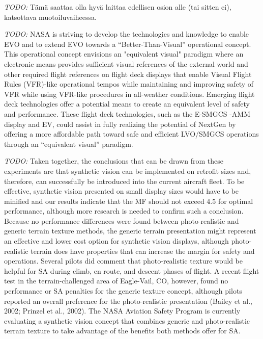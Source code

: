 \documentclass[utf8,bachelor,manualbib]{gradu3}
\begin{document}
\emph{TODO:}
Tämä saattaa olla hyvä laittaa edellisen osion alle (tai sitten ei), katsottava muotoiluvaiheessa.

\emph{TODO:}
NASA is striving to develop the technologies and knowledge to enable EVO and to extend EVO towards a “Better-Than-Visual” operational concept. This operational concept envisions an "equivalent visual" paradigm where an electronic means provides sufficient visual references of the external world and other required flight references on flight deck displays that enable Visual Flight Rules (VFR)-like operational tempos while maintaining and improving safety of VFR while using VFR-like procedures in all-weather conditions.\citep{prinzel2013}
Emerging flight deck technologies offer a potential means to create an equivalent level of safety and performance. These flight deck technologies, such as the E-SMGCS -AMM display and EV, could assist in fully realizing the potential of NextGen by offering a more affordable path toward safe and efficient LVO/SMGCS operations through an “equivalent visual” paradigm.\citep{prinzel2013}

\emph{TODO:}
Taken together, the conclusions that can be drawn from these experiments are that
synthetic vision can be implemented on retrofit sizes and, therefore, can successfully
be introduced into the current aircraft fleet. To be effective, synthetic vision
presented on small display sizes would have to be minified and our results indicate
that the MF should not exceed 4.5 for optimal performance, although more research
is needed to confirm such a conclusion.
Because no performance differences were found between photo-realistic and
generic terrain texture methods, the generic terrain presentation might represent an
effective and lower cost option for synthetic vision displays, although photo-realistic
terrain does have properties that can increase the margin for safety and operations.
Several pilots did comment that photo-realistic texture would be helpful for
SA during climb, en route, and descent phases of flight. A recent flight test in the
terrain-challenged area of Eagle-Vail, CO, however, found no performance or SA
penalties for the generic texture concept, although pilots reported an overall preference
for the photo-realistic presentation (Bailey et al., 2002; Prinzel et al., 2002).
The NASA Aviation Safety Program is currently evaluating a synthetic vision concept
that combines generic and photo-realistic terrain texture to take advantage of
the benefits both methods offer for SA. \citep{prinzel2004}
\end{document}
